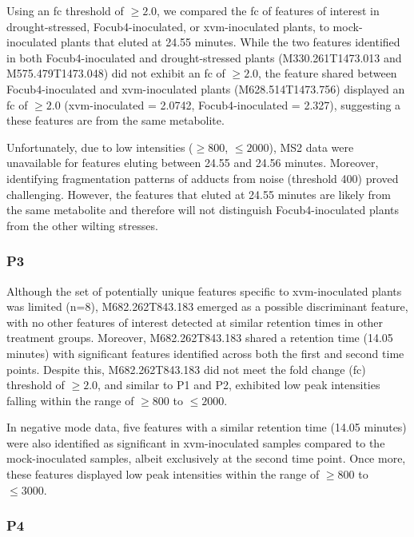 Using an \ac{fc} threshold of $\ge2.0$, we compared the \ac{fc} of features of interest in drought-stressed, \ac{Focub4}-inoculated, or \ac{xvm}-inoculated plants, to mock-inoculated plants that eluted at 24.55 minutes. While the two features identified in both \ac{Focub4}-inoculated and drought-stressed plants (M330.261T1473.013 and M575.479T1473.048) did not exhibit an \ac{fc} of $\geq2.0$, the feature shared between \ac{Focub4}-inoculated and \ac{xvm}-inoculated plants (M628.514T1473.756) displayed an \ac{fc} of $\geq2.0$ (\ac{xvm}-inoculated = 2.0742, \ac{Focub4}-inoculated = 2.327), suggesting a these features are from the same metabolite. 
 
Unfortunately, due to low intensities ($\geq800$, $\leq2000$), MS2 data were unavailable for features eluting between 24.55 and 24.56 minutes. Moreover, identifying fragmentation patterns of adducts from noise (threshold 400) proved challenging. However, the features that eluted at 24.55 minutes are likely from the same metabolite and therefore will not distinguish \ac{Focub4}-inoculated plants from the other wilting stresses.

\subsubsection{P3}

Although the set of potentially unique features specific to \ac{xvm}-inoculated plants was limited (n=8), M682.262T843.183 emerged as a possible discriminant feature, with no other features of interest detected at similar retention times in other treatment groups. Moreover, M682.262T843.183 shared a retention time (14.05 minutes) with significant features identified across both the first and second time points. Despite this, M682.262T843.183 did not meet the fold change (\ac{fc}) threshold of $\geq2.0$, and similar to P1 and P2, exhibited low peak intensities falling within the range of $\geq800$ to $\leq2000$.

In negative mode data, five features with a similar retention time (14.05 minutes) were also identified as significant in \ac{xvm}-inoculated samples compared to the mock-inoculated samples, albeit exclusively at the second time point. Once more, these features displayed low peak intensities within the range of $\geq800$ to $\leq3000$.

\subsubsection{P4}

